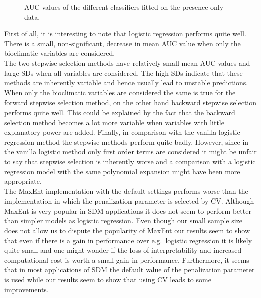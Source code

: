 \begin{figure}[!htb]
\center
{}
\caption{\label{fig:PrOnlyAUC}AUC values of the different classifiers fitted on the presence-only data.}
\end{figure}


First of all, it is interesting to note that logistic regression performs quite well. There is a small, non-significant, decrease in mean AUC value when only the bioclimatic variables are considered.\\

The two stepwise selection methods have relatively small mean AUC values and large SDs when all variables are considered. The high SDs indicate that these methods are inherently variable and hence usually lead to unstable predictions. When only the bioclimatic variables are considered the same is true for the forward stepwise selection method, on the other hand backward stepwise selection performs quite well. This could be explained by the fact that the backward selection method becomes a lot more variable when variables with little explanatory power are added. Finally, in comparison with the vanilla logistic regression method the stepwise methods perform quite badly. However, since in the vanilla logistic method only first order terms are considered it might be unfair to say that stepwise selection is inherently worse and a comparison with a logistic regression model with the same polynomial expansion might have been more appropriate. \\ 


The MaxEnt implementation with the default settings performs worse than the implementation in which the penalization parameter is selected by CV. Although MaxEnt is very popular in SDM applications it does not seem to perform better than simpler models as logistic regression. Even though our small sample size does not allow us to dispute the popularity of MaxEnt our results seem to show that even if there is a gain in performance over e.g.\ logistic regression it is likely quite small and one might wonder if the loss of interpretability and increased computational cost is worth a small gain in performance. Furthermore, it seems that in most applications of SDM the default value of the penalization parameter is used while our results seem to show that using CV leads to some improvements. \\

